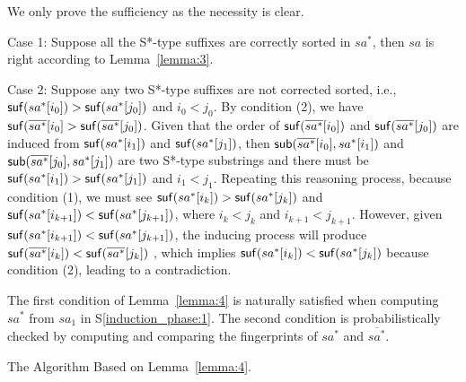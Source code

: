 \documentclass[10pt,journal,compsoc]{IEEEtran}
\begin{document}
\begin{IEEEproof}

    We only prove the sufficiency as the necessity is clear.

    Case 1: Suppose all the S*-type suffixes are correctly sorted in $sa^*$, then $sa$ is right according to Lemma~\ref{lemma:3}.

    Case 2: Suppose any two S*-type suffixes are not corrected sorted, i.e., ${\sf suf}(sa^*[i_0]) > {\sf suf}(sa^*[j_0])$ and $i_0 < j_0$. By condition (2), we have ${\sf suf}(\overline{sa^*}[i_0] > {\sf suf}(\overline{sa^*}[j_0])$. Given that the order of ${\sf suf}(\overline{sa^*}[i_0])$ and ${\sf suf}(\overline{sa^*}[j_0])$ are induced from ${\sf suf}(sa^*[i_1])$ and ${\sf suf}(sa^*[j_1])$, then ${\sf sub}(\overline{sa^*}[i_0], sa^*[i_1])$ and ${\sf sub}(\overline{sa^*}[j_0], sa^*[j_1])$ are two S*-type substrings and there must be ${\sf suf}(sa^*[i_1])>{\sf suf}(sa^*[j_1])$ and $i_1 < j_1$. Repeating this reasoning process, because condition (1), we must see ${\sf suf}(sa^*[i_k])>{\sf suf}(sa^*[j_k])$ and ${\sf suf}(sa^*[i_{k+1}])<{\sf suf}(sa^*[j_{k+1}])$, where $i_k < j_k$ and $i_{k+1} < j_{k+1}$. However, given ${\sf suf}(sa^*[i_{k+1}])<{\sf suf}(sa^*[j_{k+1}])$, the inducing process will produce ${\sf suf}(\overline{sa^*}[i_k])<{\sf suf}(\overline{sa^*}[j_k])$ , which implies ${\sf suf}(sa^*[i_k])<{\sf suf}(sa^*[j_k])$ because condition (2), leading to a contradiction.
	
\end{IEEEproof}
	

The first condition of Lemma~\ref{lemma:4} is naturally satisfied when computing $sa^*$ from $sa_1$ in S\ref{induction_phase:1}. The second condition is probabilistically checked by computing and comparing the fingerprints of $sa^*$ and $\overline{sa^*}$. 


\begin{algorithm*}

	\caption{The Algorithm Based on Lemma~\ref{lemma:4}.}
	
	\label{alg:3}
	
\end{algorithm*}
\end{document}
